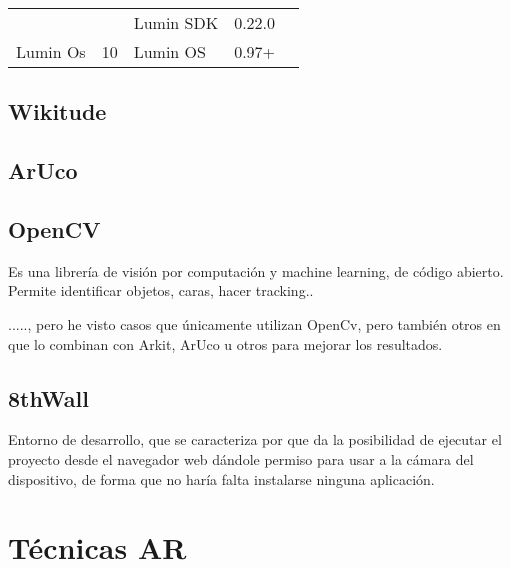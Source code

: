 \begin{table}[]
\begin{tabular}{|l|l|l|l|l|l|}
		&                          & Lumin SDK                                      & 0.22.0                                     & \multicolumn{2}{l|}{}                               \\ \cline{3-4}
		\multirow{-2}{*}{Lumin Os} & \multirow{-2}{*}{10}     & \cellcolor[HTML]{EFEFEF}Lumin OS               & \cellcolor[HTML]{EFEFEF}0.97+              & \multicolumn{2}{l|}{\multirow{-2}{*}{}}             \\ \hline
	\end{tabular}
\end{table}
\cite{vuforia_supported_versions}

\subsection{Wikitude}


\subsection{ArUco}


\subsection{OpenCV}
Es una librería de visión por computación y machine learning, de código abierto. Permite identificar objetos, caras, hacer tracking..

....., pero he visto casos que únicamente utilizan OpenCv, pero también otros en que lo combinan con Arkit, ArUco u otros para mejorar los resultados.


\subsection{8thWall}
Entorno de desarrollo, que se caracteriza por que da la posibilidad de ejecutar el proyecto desde el navegador web dándole permiso para usar a la cámara del dispositivo, de forma que no haría falta instalarse ninguna aplicación.




\section{Técnicas AR}
